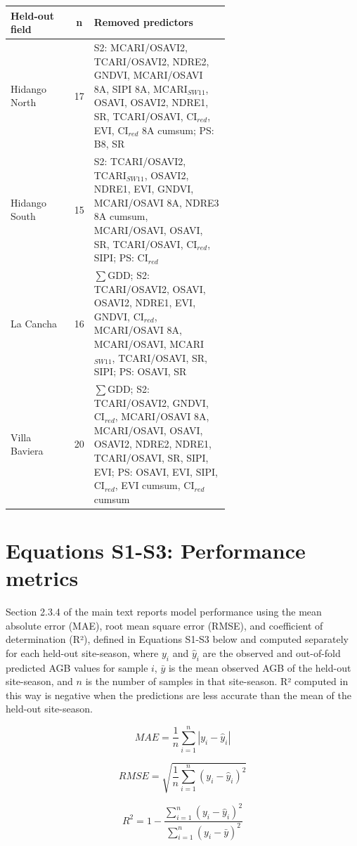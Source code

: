 \documentclass[
  english,
  review,
  number,
  sort,compress,
  authoryear,
  3p]{elsarticle}
\begin{document}
\begin{table}[htbp]
\centering
\footnotesize
\begin{tabular}{l c p{0.62\linewidth}}
\toprule
\textbf{Held-out field} & \textbf{n} & \textbf{Removed predictors} \\
\midrule
Hidango North & 17 & S2: MCARI/OSAVI2, TCARI/OSAVI2, NDRE2, GNDVI, MCARI/OSAVI 8A, SIPI 8A, MCARI$_{SW11}$, OSAVI, OSAVI2, NDRE1, SR, TCARI/OSAVI, CI$_{red}$, EVI, CI$_{red}$ 8A cumsum; PS: B8, SR \\
Hidango South & 15 & S2: TCARI/OSAVI2, TCARI$_{SW11}$, OSAVI2, NDRE1, EVI, GNDVI, MCARI/OSAVI 8A, NDRE3 8A cumsum, MCARI/OSAVI, OSAVI, SR, TCARI/OSAVI, CI$_{red}$, SIPI; PS: CI$_{red}$ \\
La Cancha & 16 & $\sum$GDD; S2: TCARI/OSAVI2, OSAVI, OSAVI2, NDRE1, EVI, GNDVI, CI$_{red}$, MCARI/OSAVI 8A, MCARI/OSAVI, MCARI$_{SW11}$, TCARI/OSAVI, SR, SIPI; PS: OSAVI, SR \\
Villa Baviera & 20 & $\sum$GDD; S2: TCARI/OSAVI2, GNDVI, CI$_{red}$, MCARI/OSAVI 8A, MCARI/OSAVI, OSAVI, OSAVI2, NDRE2, NDRE1, TCARI/OSAVI, SR, SIPI, EVI; PS: OSAVI, EVI, SIPI, CI$_{red}$, EVI cumsum, CI$_{red}$ cumsum \\
\bottomrule
\end{tabular}
\end{table}

\section{Equations S1-S3: Performance
metrics}\label{equations-s1-s3-performance-metrics}

Section 2.3.4 of the main text reports model performance using the mean
absolute error (MAE), root mean square error (RMSE), and coefficient of
determination (R²), defined in Equations S1-S3 below and computed
separately for each held-out site-season, where \(y_i\) and
\(\hat{y}_i\) are the observed and out-of-fold predicted AGB values for
sample \(i\), \(\bar{y}\) is the mean observed AGB of the held-out
site-season, and \(n\) is the number of samples in that site-season. R²
computed in this way is negative when the predictions are less accurate
than the mean of the held-out site-season.

\[
MAE = \frac{1}{n}\sum_{i=1}^{n}\left|y_i - \hat{y}_i\right| \tag{S1}
\]

\[
RMSE = \sqrt{\frac{1}{n}\sum_{i=1}^{n}\left(y_i - \hat{y}_i\right)^2} \tag{S2}
\]

\[
R^2 = 1 - \frac{\displaystyle\sum_{i=1}^{n}\left(y_i - \hat{y}_i\right)^2}{\displaystyle\sum_{i=1}^{n}\left(y_i - \bar{y}\right)^2} \tag{S3}
\]
\end{document}
